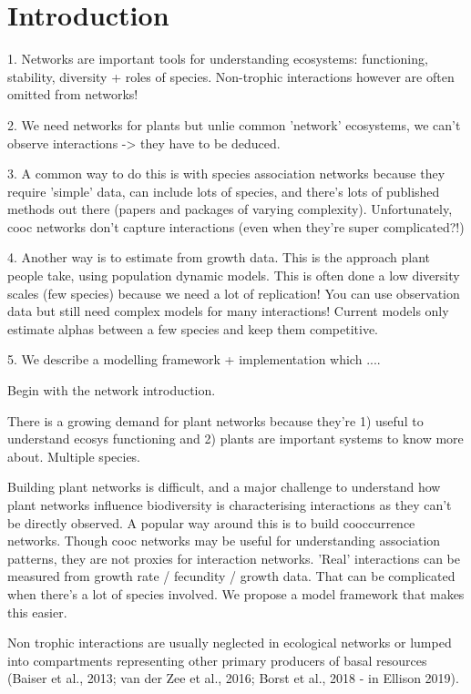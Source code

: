 \documentclass[a4,12pt]{article}
\begin{document}
\section{Introduction}
    
    1. Networks are important tools for understanding ecosystems: functioning, stability, diversity + roles of species. Non-trophic interactions however are often omitted from networks! 


    2. We need networks for plants but unlie common 'network' ecosystems, we can't observe interactions -> they have to be deduced.
    
    3. A common way to do this is with species association networks because they require 'simple' data, can include lots of species, and there's lots of published methods out there (papers and packages of varying complexity). Unfortunately, cooc networks don't capture interactions (even when they're super complicated?!)

    4. Another way is to estimate from growth data. This is the approach plant people take, using population dynamic models. This is often done a low diversity scales (few species) because we need a lot of replication! 
    You can use observation data but still need complex models for many interactions! Current models only estimate alphas between a few species and keep them competitive. 


    5. We describe a modelling framework + implementation which ....



    Begin with the network introduction.

    There is a growing demand for plant networks because they're 1) useful to understand ecosys functioning and 2) plants are important systems to know more about. Multiple species.    

    Building plant networks is difficult, and a major challenge to understand how plant networks influence biodiversity is characterising interactions as they can't be directly observed. A popular way around this is to build cooccurrence networks. Though cooc networks may be useful for understanding association patterns, they are not proxies for interaction networks. 'Real' interactions can be measured from growth rate / fecundity / growth data. That can be complicated when there's a lot of species involved. 
    We propose a model framework that makes this easier.
 
  
    Non trophic interactions are usually neglected in ecological networks or lumped into compartments representing other primary producers of basal resources (Baiser et al., 2013; van der Zee et al., 2016; Borst et al., 2018 - in Ellison 2019).   
\end{document}
